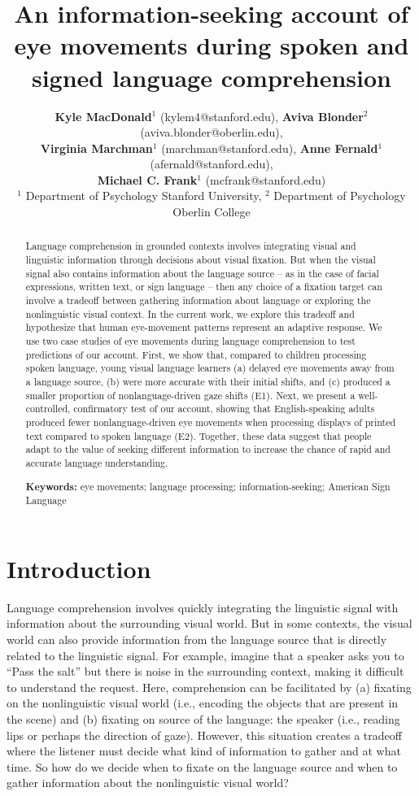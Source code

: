 \documentclass[10pt, letterpaper]{article}
\title{An information-seeking account of eye movements during spoken and signed
language comprehension}
\author{ {\large \bf Kyle MacDonald}$^1$ (kylem4@stanford.edu), {\large \bf Aviva Blonder}$^2$ (aviva.blonder@oberlin.edu), \\  {\large \bf Virginia Marchman}$^1$ (marchman@stanford.edu), {\large \bf Anne Fernald}$^1$ (afernald@stanford.edu), \\ {\large \bf Michael C. Frank}$^1$ (mcfrank@stanford.edu)  \\
   $^1$ Department of Psychology Stanford University, $^2$ Department of Psychology Oberlin College}
\begin{document}
\maketitle

\begin{abstract}
Language comprehension in grounded contexts involves integrating visual
and linguistic information through decisions about visual fixation. But
when the visual signal also contains information about the language
source -- as in the case of facial expressions, written text, or sign
language -- then any choice of a fixation target can involve a tradeoff
between gathering information about language or exploring the
nonlinguistic visual context. In the current work, we explore this
tradeoff and hypothesize that human eye-movement patterns represent an
adaptive response. We use two case studies of eye movements during
language comprehension to test predictions of our account. First, we
show that, compared to children processing spoken language, young visual
language learners (a) delayed eye movements away from a language source,
(b) were more accurate with their initial shifts, and (c) produced a
smaller proportion of nonlanguage-driven gaze shifts (E1). Next, we
present a well-controlled, confirmatory test of our account, showing
that English-speaking adults produced fewer nonlanguage-driven eye
movements when processing displays of printed text compared to spoken
language (E2). Together, these data suggest that people adapt to the
value of seeking different information to increase the chance of rapid
and accurate language understanding.

\textbf{Keywords:}
eye movements; language processing; information-seeking; American Sign
Language
\end{abstract}

\section{Introduction}\label{introduction}

Language comprehension involves quickly integrating the linguistic
signal with information about the surrounding visual world. But in some
contexts, the visual world can also provide information from the
language source that is directly related to the linguistic signal. For
example, imagine that a speaker asks you to ``Pass the salt'' but there
is noise in the surrounding context, making it difficult to understand
the request. Here, comprehension can be facilitated by (a) fixating on
the nonlinguistic visual world (i.e., encoding the objects that are
present in the scene) and (b) fixating on source of the language: the
speaker (i.e., reading lips or perhaps the direction of gaze). However,
this situation creates a tradeoff where the listener must decide what
kind of information to gather and at what time. So how do we decide when
to fixate on the language source and when to gather information about
the nonlinguistic visual world?
\end{document}
